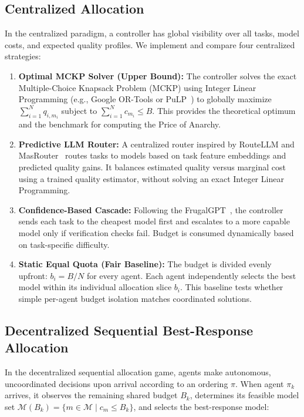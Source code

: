\documentclass{article}
\begin{document}
\subsection{Centralized Allocation} 
\label{sec:centralized}

In the centralized paradigm, a controller has global visibility over all tasks, model costs, and expected quality profiles. We implement and compare four centralized strategies: 

\begin{enumerate}[leftmargin=*] 
    \item \textbf{Optimal MCKP Solver (Upper Bound):} The controller solves the exact Multiple-Choice Knapsack Problem (MCKP) using Integer Linear Programming (e.g., Google OR-Tools or PuLP~\cite{chen2021evaluating}) to globally maximize $\sum_{i=1}^N q_{i,m_i}$ subject to $\sum_{i=1}^N c_{m_i} \leq B$. This provides the theoretical optimum and the benchmark for computing the Price of Anarchy. 

    \item \textbf{Predictive LLM Router:} A centralized router inspired by RouteLLM and MasRouter~\cite{yue2025masrouter} routes tasks to models based on task feature embeddings and predicted quality gains. It balances estimated quality versus marginal cost using a trained quality estimator, without solving an exact Integer Linear Programming. 

    \item \textbf{Confidence-Based Cascade:} Following the FrugalGPT~\cite{chen2023frugalgpt}, the controller sends each task to the cheapest model first and escalates to a more capable model only if verification checks fail. Budget is consumed dynamically based on task-specific difficulty. 

    \item \textbf{Static Equal Quota (Fair Baseline):} The budget is divided evenly upfront: $b_i = B/N$ for every agent. Each agent independently selects the best model within its individual allocation slice $b_i$. This baseline tests whether simple per-agent budget isolation matches coordinated solutions. 
\end{enumerate} 

\subsection{Decentralized Sequential Best-Response Allocation} 
\label{sec:decentralized}

In the decentralized sequential allocation game, agents make autonomous, uncoordinated decisions upon arrival according to an ordering $\pi$. When agent $\pi_k$ arrives, it observes the remaining shared budget $B_k$, determines its feasible model set $\mathcal{M}(B_k) = \{m \in \mathcal{M} \mid c_m \leq B_k\}$, and selects the best-response model:
\end{document}
